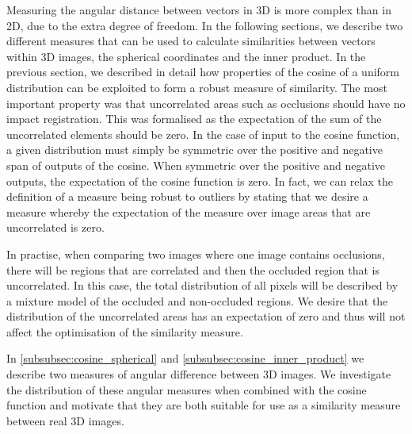 Measuring the angular distance between vectors in 3D is more complex than in 2D,
due to the extra degree of freedom. In the following sections, we describe two
different measures that can be used to calculate similarities between vectors
within 3D images, the spherical coordinates and the inner product. In the
previous section, we described in detail how properties of the cosine of a
uniform distribution can be exploited to form a robust measure of similarity.
The most important property was that uncorrelated areas such as occlusions
should have no impact registration. This was formalised as the expectation of
the sum of the uncorrelated elements should be zero. In the case of input to the
cosine function, a given distribution must simply be symmetric over the positive
and negative span of outputs of the cosine. When symmetric over the positive and
negative outputs, the expectation of the cosine function is zero. In fact, we
can relax the definition of a measure being robust to outliers by stating that
we desire a measure whereby the expectation of the measure over image areas that
are uncorrelated is zero.

In practise, when comparing two images where one image contains occlusions,
there will be regions that are correlated and then the occluded region that is
uncorrelated. In this case, the total distribution of all pixels will be
described by a mixture model of the occluded and non-occluded regions. We desire
that the distribution of the uncorrelated areas has an expectation of zero and
thus will not affect the optimisation of the similarity measure.

In \cref{subsubsec:cosine_spherical} and
\cref{subsubsec:cosine_inner_product} we describe two measures of angular
difference between 3D images. We investigate the distribution of these angular
measures when combined with the cosine function and motivate that they are both
suitable for use as a similarity measure between real 3D images.
